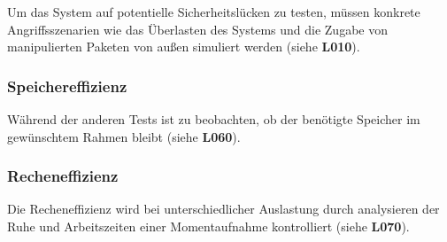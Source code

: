 Um das System auf potentielle Sicherheitslücken zu testen, müssen konkrete Angriffsszenarien wie das Überlasten des Systems und die Zugabe von manipulierten Paketen von außen simuliert werden (siehe \textbf{L010}).


\subsubsection{Speichereffizienz}

Während der anderen Tests ist zu beobachten, ob der benötigte Speicher im gewünschtem Rahmen bleibt (siehe \textbf{L060}).


\subsubsection{Recheneffizienz}

Die Recheneffizienz wird bei unterschiedlicher Auslastung durch analysieren der Ruhe und Arbeitszeiten einer Momentaufnahme kontrolliert (siehe \textbf{L070}).